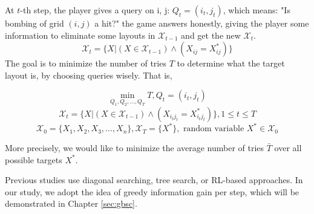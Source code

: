 At $t$-th step, the player gives a query on i, j: $Q_t  = (i_t,j_t)$, which means: "Is bombing of grid $(i,j)$ a hit?" the game answers honestly, giving the player some information to eliminate some layouts in $\mathcal{X}_{t-1}$ and get the new $\mathcal{X}_{t}$.
$$\mathcal{X}_t = \{X|(X\in \mathcal{X}_{t-1}) \wedge (X_{ij} = X^{*}_{ij})\}$$
The goal is to minimize the number of tries $T$ to determine what the target layout is,  by choosing queries wisely. That is, 

$$    \min_{Q_1, Q_2, \dots, Q_T} T  , Q_t = (i_t, j_t)$$
$$    \mathcal{X}_t = \{X|(X\in \mathcal{X}_{t-1}) \wedge (X_{i_t j_t} = X^{*}_{i_t j_t})\} , 1 \leq t \leq T$$
$$\mathcal{X}_0 = \{ X_1, X_2, X_3, \dots, X_n \},	\mathcal{X}_T = \{X^{*}\}, \text{ random variable } X^* \in \mathcal{X}_0 $$

More precisely, we would like to minimize the average number of tries $\bar{T}$ over all possible targets $X^{*}$.


Previous studies use diagonal searching\cite{Rodin}, tree search\cite{battleshipoptimal}, or RL-based\cite{battleshiprl} approaches. In our study, we adopt the idea of greedy information gain per step, which will be demonstrated in Chapter \ref{sec:gbsc}.



